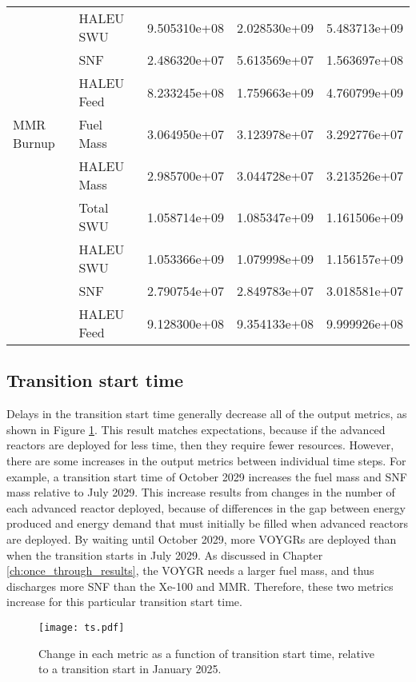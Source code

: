 \begin{table}
\begin{tabular}{llrrr}
                      &  HALEU SWU & 9.505310e+08 & 2.028530e+09 & 5.483713e+09 \\
                      &        SNF & 2.486320e+07 & 5.613569e+07 & 1.563697e+08 \\
                      & HALEU Feed & 8.233245e+08 & 1.759663e+09 & 4.760799e+09 \\\hline 
        MMR Burnup &  Fuel Mass & 3.064950e+07 & 3.123978e+07 & 3.292776e+07 \\
                   & HALEU Mass & 2.985700e+07 & 3.044728e+07 & 3.213526e+07 \\
                   &  Total SWU & 1.058714e+09 & 1.085347e+09 & 1.161506e+09 \\
                   &  HALEU SWU & 1.053366e+09 & 1.079998e+09 & 1.156157e+09 \\
                   &        SNF & 2.790754e+07 & 2.849783e+07 & 3.018581e+07 \\
                   & HALEU Feed & 9.128300e+08 & 9.354133e+08 & 9.999926e+08 \\
        \hline
    \end{tabular}
\end{table}


\subsection{Transition start time}
Delays in the transition start time generally decrease all of the output 
metrics, as shown in Figure \ref{fig:ts_scenario7}. This result matches 
expectations, because if the advanced reactors are deployed for less time, 
then they require fewer resources. However, there are some increases in 
the output metrics between individual time steps. For example, a transition 
start time of October 2029 increases the fuel mass and \gls{SNF} mass 
relative to July 2029. This increase results from changes in the number 
of each advanced reactor deployed, because of differences in the gap 
between energy produced and energy demand that must initially be filled when 
advanced reactors are deployed. By waiting until October 2029, more VOYGRs 
are deployed than when the transition starts in July 2029. As discussed in 
Chapter \ref{ch:once_through_results}, the VOYGR needs a larger fuel mass, 
and thus discharges more \gls{SNF} than the Xe-100 and \gls{MMR}. Therefore, 
these two metrics increase for this particular transition start time. 

\begin{figure}
    \centering
    \texttt{[image: ts.pdf]}
    \caption{Change in each metric as a function of transition start 
    time, relative to a transition start in January 2025.}
    \label{fig:ts_scenario7}
\end{figure}

